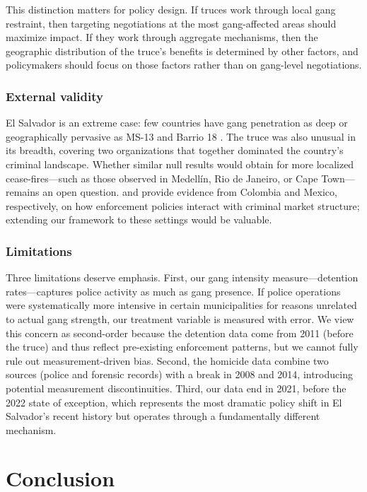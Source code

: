 \documentclass[12pt]{article}
\begin{document}
This distinction matters for policy design. If truces work through local gang restraint, then targeting negotiations at the most gang-affected areas should maximize impact. If they work through aggregate mechanisms, then the geographic distribution of the truce's benefits is determined by other factors, and policymakers should focus on those factors rather than on gang-level negotiations.

\subsubsection*{External validity} El Salvador is an extreme case: few countries have gang penetration as deep or geographically pervasive as MS-13 and Barrio 18 \citep{blattman_etal2023}. The truce was also unusual in its breadth, covering two organizations that together dominated the country's criminal landscape. Whether similar null results would obtain for more localized cease-fires---such as those observed in Medell\'in, Rio de Janeiro, or Cape Town---remains an open question. \citet{castillo_etal2020} and \citet{calderon_etal2015} provide evidence from Colombia and Mexico, respectively, on how enforcement policies interact with criminal market structure; extending our framework to these settings would be valuable.

\subsubsection*{Limitations} Three limitations deserve emphasis. First, our gang intensity measure---detention rates---captures police activity as much as gang presence. If police operations were systematically more intensive in certain municipalities for reasons unrelated to actual gang strength, our treatment variable is measured with error. We view this concern as second-order because the detention data come from 2011 (before the truce) and thus reflect pre-existing enforcement patterns, but we cannot fully rule out measurement-driven bias. Second, the homicide data combine two sources (police and forensic records) with a break in 2008 and 2014, introducing potential measurement discontinuities. Third, our data end in 2021, before the 2022 state of exception, which represents the most dramatic policy shift in El Salvador's recent history but operates through a fundamentally different mechanism.


\section{Conclusion}
\end{document}
